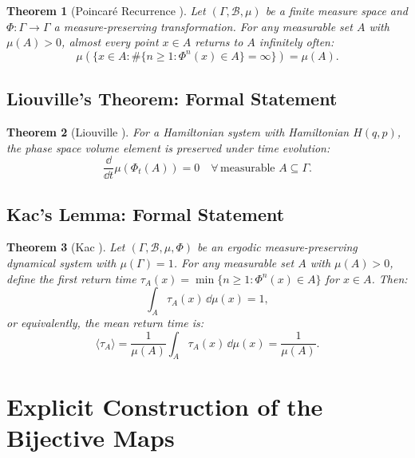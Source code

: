 \documentclass[11pt,twocolumn,a4paper]{article}
\newtheorem{theorem}{Theorem}[section]
\begin{document}
\begin{theorem}[Poincar\'{e} Recurrence \citep{poincare1890}]
Let $(\Gamma, \mathcal{B}, \mu)$ be a finite measure space and
$\Phi : \Gamma \to \Gamma$ a measure-preserving transformation.
For any measurable set $A$ with $\mu(A) > 0$, almost every point
$x \in A$ returns to $A$ infinitely often:
\begin{equation}
\mu\!\left(\{x \in A :
  \#\{n \geq 1 : \Phi^n(x) \in A\} = \infty\}\right)
= \mu(A).
\end{equation}
\end{theorem}

\subsection{Liouville's Theorem: Formal Statement}

\begin{theorem}[Liouville \citep{liouville1838,goldstein2002}]
For a Hamiltonian system with Hamiltonian $H(q,p)$, the phase
space volume element is preserved under time evolution:
\begin{equation}
\frac{\dd}{\dd{t}} \mu(\Phi_t(A)) = 0
\quad \forall\,\text{measurable } A \subseteq \Gamma.
\end{equation}
\end{theorem}

\subsection{Kac's Lemma: Formal Statement}

\begin{theorem}[Kac \citep{kac1947}]
Let $(\Gamma, \mathcal{B}, \mu, \Phi)$ be an ergodic
measure-preserving dynamical system with $\mu(\Gamma) = 1$. For any
measurable set $A$ with $\mu(A) > 0$, define the first return time
$\tau_A(x) = \min\{n \geq 1 : \Phi^n(x) \in A\}$ for $x \in A$.
Then:
\begin{equation}
\int_A \tau_A(x)\,\dd{\mu(x)} = 1,
\end{equation}
or equivalently, the mean return time is:
\begin{equation}
\langle \tau_A \rangle
= \frac{1}{\mu(A)} \int_A \tau_A(x)\,\dd{\mu(x)}
= \frac{1}{\mu(A)}.
\end{equation}
\end{theorem}


\section{Explicit Construction of the Bijective Maps}
\label{app:bijections}
\end{document}
